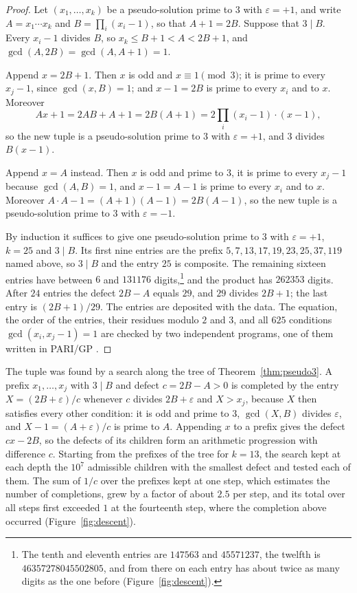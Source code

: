 \documentclass[11pt,reqno]{amsart}
\numberwithin{equation}{section}
\theoremstyle{plain}
\theoremstyle{definition}
\theoremstyle{remark}
\begin{document}
\begin{proof}
Let $(x_1,\dots,x_k)$ be a pseudo-solution prime to $3$ with
$\varepsilon=+1$, and write $A=x_1\cdots x_k$ and
$B=\prod_i(x_i-1)$, so that $A+1=2B$. Suppose that $3\mid B$. Every
$x_i-1$ divides $B$, so $x_k\le B+1<A<2B+1$, and
$\gcd(A,2B)=\gcd(A,A+1)=1$.

Append $x=2B+1$. Then $x$ is odd and $x\equiv1\pmod3$; it is prime to
every $x_j-1$, since $\gcd(x,B)=1$; and $x-1=2B$ is prime to every
$x_i$ and to $x$. Moreover
\[
  Ax+1=2AB+A+1=2B(A+1)=2\prod_i(x_i-1)\cdot(x-1),
\]
so the new tuple is a pseudo-solution prime to $3$ with
$\varepsilon=+1$, and $3$ divides $B(x-1)$.

Append $x=A$ instead. Then $x$ is odd and prime to $3$, it is prime
to every $x_j-1$ because $\gcd(A,B)=1$, and $x-1=A-1$ is prime to every
$x_i$ and to $x$. Moreover $A\cdot A-1=(A+1)(A-1)=2B(A-1)$, so the
new tuple is a pseudo-solution prime to $3$ with $\varepsilon=-1$.

By induction it suffices to give one pseudo-solution prime to $3$
with $\varepsilon=+1$, $k=25$ and $3\mid B$. Its first nine entries
are the prefix $5,7,13,17,19,23,25,37,119$ named above, so $3\mid B$
and the entry $25$ is composite. The remaining sixteen entries have
between $6$ and $131176$ digits,\footnote{The tenth and eleventh
entries are $147563$ and $45571237$, the twelfth is
$46357278045502805$, and from there on each entry has about twice as
many digits as the one before (Figure~\ref{fig:descent}).} and the
product has $262353$ digits.
After $24$ entries the defect $2B-A$ equals $29$, and $29$ divides
$2B+1$; the last entry is $(2B+1)/29$. The entries are deposited with
the data. The equation, the order of the entries, their residues
modulo $2$ and $3$, and all $625$ conditions $\gcd(x_i,x_j-1)=1$ are
checked by two independent programs, one of them written in
PARI/GP \cite{PARI}.
\end{proof}

The tuple was found by a search along the tree of
Theorem~\ref{thm:pseudo3}. A prefix $x_1,\dots,x_j$ with $3\mid B$
and defect $c=2B-A>0$ is completed by the entry
$X=(2B+\varepsilon)/c$ whenever $c$ divides $2B+\varepsilon$ and
$X>x_j$, because $X$ then satisfies every other condition: it is odd
and prime to $3$, $\gcd(X,B)$ divides $\varepsilon$, and
$X-1=(A+\varepsilon)/c$ is prime to $A$. Appending $x$ to a prefix gives the defect
$cx-2B$, so the defects of its children form an arithmetic progression
with difference $c$. Starting from the prefixes of the tree for $k=13$,
the search kept at each depth the $10^7$ admissible children with the
smallest defect and tested each of them. The sum of $1/c$ over the
prefixes kept at one step, which estimates the number of completions,
grew by a factor of about $2.5$ per step, and its total over all steps
first exceeded $1$ at the fourteenth step, where the completion above
occurred (Figure~\ref{fig:descent}).
\end{document}
